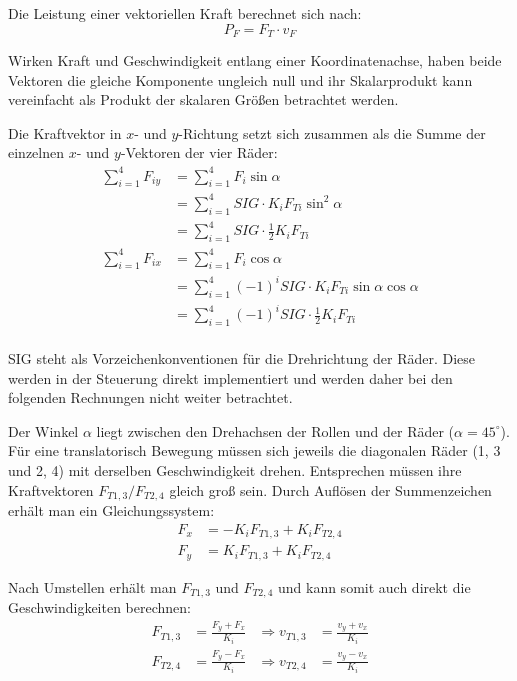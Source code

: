 Die Leistung einer vektoriellen Kraft berechnet sich nach:
$$ P_F = F_T \cdot v_F $$

Wirken Kraft und Geschwindigkeit entlang einer Koordinatenachse, haben beide Vektoren die gleiche Komponente ungleich null und ihr Skalarprodukt kann vereinfacht als Produkt der skalaren Größen betrachtet werden.

Die Kraftvektor in $x$- und $y$-Richtung setzt sich zusammen als die Summe der einzelnen $x$- und $y$-Vektoren der vier Räder:
\begin{align*}
    \sum_{i=1}^4 F_{iy} &= \sum_{i=1}^4 F_i \sin \alpha                 \\
    &= \sum_{i=1}^4 SIG \cdot K_i F_{Ti} \sin^2 \alpha                  \\
    &= \sum_{i=1}^4 SIG \cdot \frac{1}{2} K_i F_{Ti}                    \\
    \sum_{i=1}^4 F_{ix} &= \sum_{i=1}^4 F_i \cos \alpha                 \\
    &= \sum_{i=1}^4 (-1)^i SIG \cdot K_i F_{Ti} \sin \alpha \cos \alpha \\
    &= \sum_{i=1}^4 (-1)^i SIG \cdot \frac{1}{2} K_i F_{Ti}             \\
\end{align*}

SIG steht als Vorzeichenkonventionen für die Drehrichtung der Räder. Diese werden in der Steuerung direkt implementiert und werden daher bei den folgenden Rechnungen nicht weiter betrachtet.

Der Winkel $ \alpha $ liegt zwischen den Drehachsen der Rollen und der Räder ($\alpha = 45^\circ$).
Für eine translatorisch Bewegung müssen sich jeweils die diagonalen Räder (1, 3 und 2, 4) mit derselben Geschwindigkeit drehen. Entsprechen müssen ihre Kraftvektoren $F_{T1, 3} / F_{T2, 4}$ gleich groß sein.
Durch Auflösen der Summenzeichen erhält man ein Gleichungssystem:
\begin{align*}
    F_x &= - K_i F_{T1, 3} + K_i F_{T2, 4} \\
    F_y &= K_i F_{T1, 3}   + K_i F_{T2, 4}
\end{align*}

Nach Umstellen erhält man $F_{T1, 3}$ und $F_{T2, 4}$ und kann somit auch direkt die Geschwindigkeiten berechnen:
\begin{align*}
    F_{T1, 3} &= \frac{F_y + F_x}{K_i} &\Rightarrow v_{T1, 3} &= \frac{v_y + v_x}{K_i} \\
    F_{T2, 4} &= \frac{F_y - F_x}{K_i} &\Rightarrow v_{T2, 4} &= \frac{v_y - v_x}{K_i} \\
\end{align*}

